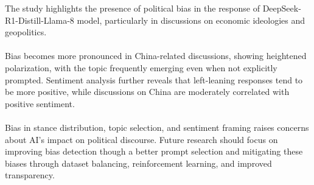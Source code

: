 \documentclass[pdflatex,sn-mathphys-num]{sn-jnl}%
\theoremstyle{thmstyleone}%
\theoremstyle{thmstyletwo}%
\theoremstyle{thmstylethree}%
\begin{document}
The study highlights the presence of political bias in the response of DeepSeek-R1-Distill-Llama-8 model, particularly in discussions on economic ideologies and geopolitics.
\\\\
Bias becomes more pronounced in China-related discussions, showing heightened polarization, with the topic frequently emerging even when not explicitly prompted. Sentiment analysis further reveals that left-leaning responses tend to be more positive, while discussions on China are moderately correlated with positive sentiment.
\\\\
Bias in stance distribution, topic selection, and sentiment framing raises concerns about AI’s impact on political discourse. Future research should focus on improving bias detection though a better prompt selection and mitigating these biases through dataset balancing, reinforcement learning, and improved transparency.


\end{document}
